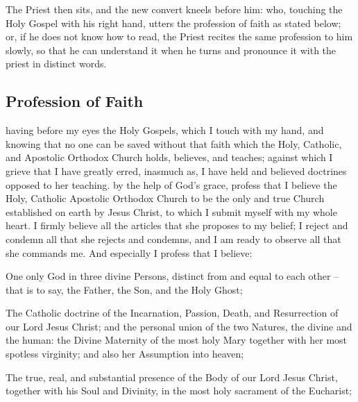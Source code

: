 

\begin{rubric}
    The Priest then sits, and the new convert kneels before him: who, touching the Holy Gospel with his right hand, utters the profession of faith as stated below; or, if he does not know how to read, the Priest recites the same profession to him slowly, so that he can understand it when he turns and pronounce it with the priest in distinct words.
\end{rubric}
\subsection{Profession of Faith}
 having before my eyes the Holy Gospels, which I touch with my hand, and knowing that no one can be saved without that faith which the Holy, Catholic, and Apostolic 
Orthodox Church holds, believes, and teaches; against which I grieve that I have greatly erred, inasmuch as, I have held and believed doctrines opposed to her teaching.
 by the help of God’s grace, profess that I believe the Holy, Catholic Apostolic 
Orthodox Church to be the only and true Church established on earth by Jesus Christ, to which I submit myself with my whole heart. I firmly believe all the articles that she proposes to my belief; I reject and condemn all that she rejects and condemns, and I am ready to observe all that she commands me. And especially I profess that I believe:

One only God in three divine Persons, distinct from and equal to each other -- that is to say, the Father, the Son, and the Holy Ghost;

The Catholic doctrine of the Incarnation, Passion, Death, and Resurrection of our Lord Jesus Christ; and the personal union of the two Natures, the divine and the human: the Divine Maternity of the most holy Mary together with her most spotless virginity; and also her 
Assumption into heaven;

The true, real, and substantial presence of the Body of our Lord Jesus Christ, together with his Soul and Divinity, in the most holy sacrament of the Eucharist;

